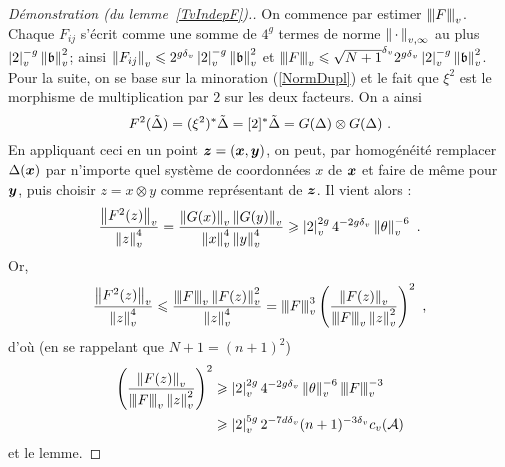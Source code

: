 \documentclass[11pt, twoside, a4paper]{article}
\theoremstyle{remark}
\begin{document}
\begin{proof}[Démonstration (du lemme~\ref{TvIndepF}).]
 On commence par estimer $\nnv{F}$. Chaque $F_{ij}$ s'écrit comme une somme de $4^g$ termes de norme $\nv[v, \infty]{\truc}$ au plus $\av 2^{-g} \nv \BA^2$; ainsi $\nv {F_{ij}} \le 2^{g\dv} \av 2 ^{-g} \nv \BA ^2$ et $\nnv F \le  \sqrt{N+1}^\dv 2^{g\dv} \av 2 ^{-g} \nv \BA ^2$. Pour la suite, on se base sur la minoration (\ref{NormDupl}) et le fait que $\xi^2$ est le morphisme de multiplication par $2$ sur les deux facteurs. On a ainsi
 \[
 F^2(\tilde\Delta) = (\xi^2)^*\tilde\Delta  = [2]^* \tilde\Delta = G(\Delta) \otimes G(\Delta) \pmm.
 \]
 En appliquant ceci en un point $\p z = (\p x, \p y)$, on peut, par homogénéité remplacer $\Delta(\p x)$ par n'importe quel système de coordonnées $x$ de $\p x$ et faire de même pour $\p y$, puis choisir $z = x \otimes y$ comme représentant de $\p z$. Il vient alors :
 \[
  \frac {\nv{F^2(z)}} {\nv z ^4} = \frac {\nv{G(x)} \nv{G(y)}} {\nv x ^4 \nv y ^4} \ge \av 2 ^{2g} 4^{-2g\dv} \nv\coa ^{-6} \pmm.
 \]
 Or,
 \[
 \frac {\nv{F^2(z)}} {\nv z ^4} \le \frac {\nnv F \nv{F(z)}^2} {\nv z ^4} = \nnv F ^3 \left( \frac {\nv{F(z)}} {\nnv F \nv z ^2} \right) ^2 \pmm,
 \]
 d'où (en se rappelant que $N+1 = (n+1)^2$)
 \begin{align*}
  \left(\frac {\nv{F(z)}} {\nnv F \nv z ^2} \right)^2
  & \ge \av2^{2g} 4^{-2g\dv} \nv\coa^{-6} \nnv F ^{-3} \\
  & \ge \av2^{5g} 2^{-7d\dv} (n+1)^{-3\dv} c_v(\A)
 \end{align*}
 et le lemme.
\end{proof}
\end{document}
